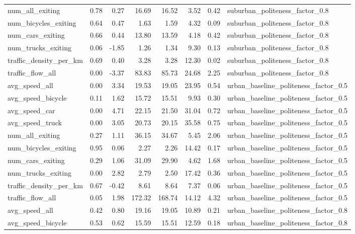 \begin{table}[ht]
\begin{tabular}{lrrrrrrl}
  num\_all\_exiting & 0.78 & 0.27 & 16.69 & 16.52 & 3.52 & 0.42 & suburban\_politeness\_factor\_0.8 \\ 
  num\_bicycles\_exiting & 0.64 & 0.47 & 1.63 & 1.59 & 4.32 & 0.09 & suburban\_politeness\_factor\_0.8 \\ 
  num\_cars\_exiting & 0.66 & 0.44 & 13.80 & 13.59 & 4.18 & 0.42 & suburban\_politeness\_factor\_0.8 \\ 
  num\_trucks\_exiting & 0.06 & -1.85 & 1.26 & 1.34 & 9.30 & 0.13 & suburban\_politeness\_factor\_0.8 \\ 
  traffic\_density\_per\_km & 0.69 & 0.40 & 3.28 & 3.28 & 12.30 & 0.02 & suburban\_politeness\_factor\_0.8 \\ 
  traffic\_flow\_all & 0.00 & -3.37 & 83.83 & 85.73 & 24.68 & 2.25 & suburban\_politeness\_factor\_0.8 \\ 
  avg\_speed\_all & 0.00 & 3.34 & 19.53 & 19.05 & 23.95 & 0.54 & urban\_baseline\_politeness\_factor\_0.5 \\ 
  avg\_speed\_bicycle & 0.11 & 1.62 & 15.72 & 15.51 & 9.93 & 0.30 & urban\_baseline\_politeness\_factor\_0.5 \\ 
  avg\_speed\_car & 0.00 & 4.71 & 22.15 & 21.50 & 31.04 & 0.72 & urban\_baseline\_politeness\_factor\_0.5 \\ 
  avg\_speed\_truck & 0.00 & 3.05 & 20.73 & 20.15 & 35.58 & 0.75 & urban\_baseline\_politeness\_factor\_0.5 \\ 
  num\_all\_exiting & 0.27 & 1.11 & 36.15 & 34.67 & 5.45 & 2.06 & urban\_baseline\_politeness\_factor\_0.5 \\ 
  num\_bicycles\_exiting & 0.95 & 0.06 & 2.27 & 2.26 & 14.42 & 0.17 & urban\_baseline\_politeness\_factor\_0.5 \\ 
  num\_cars\_exiting & 0.29 & 1.06 & 31.09 & 29.90 & 4.62 & 1.68 & urban\_baseline\_politeness\_factor\_0.5 \\ 
  num\_trucks\_exiting & 0.00 & 2.82 & 2.79 & 2.50 & 17.42 & 0.36 & urban\_baseline\_politeness\_factor\_0.5 \\ 
  traffic\_density\_per\_km & 0.67 & -0.42 & 8.61 & 8.64 & 7.37 & 0.06 & urban\_baseline\_politeness\_factor\_0.5 \\ 
  traffic\_flow\_all & 0.05 & 1.98 & 172.32 & 168.74 & 14.12 & 4.32 & urban\_baseline\_politeness\_factor\_0.5 \\ 
  avg\_speed\_all & 0.42 & 0.80 & 19.16 & 19.05 & 10.89 & 0.21 & urban\_baseline\_politeness\_factor\_0.8 \\ 
  avg\_speed\_bicycle & 0.53 & 0.62 & 15.59 & 15.51 & 12.59 & 0.18 & urban\_baseline\_politeness\_factor\_0.8 \\ 

\end{tabular}
\end{table}
